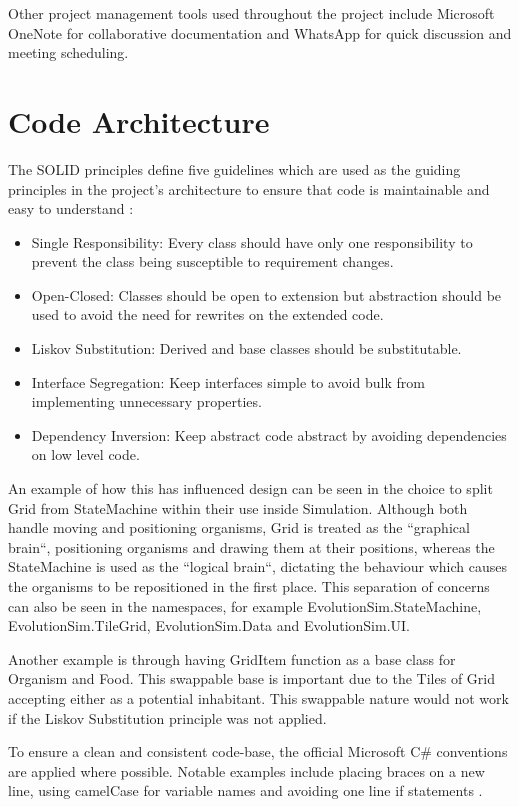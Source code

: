 \documentclass[a4paper, oneside, 11pt]{report}
\begin{document}
Other project management tools used throughout the project include Microsoft OneNote for collaborative documentation and WhatsApp for quick discussion and meeting scheduling.

\section{Code Architecture}\label{architecture}
The SOLID principles define five guidelines which are used as the guiding principles in the project's architecture to ensure that code is maintainable and easy to understand \cite{kelmendi}:
\begin{itemize}
	\item Single Responsibility: Every class should have only one responsibility to prevent the class being susceptible to requirement changes.
	\item Open-Closed: Classes should be open to extension but abstraction should be used to avoid the need for rewrites on the extended code.
	\item Liskov Substitution: Derived and base classes should be substitutable.
	\item Interface Segregation: Keep interfaces simple to avoid bulk from implementing unnecessary properties.
	\item Dependency Inversion: Keep abstract code abstract by avoiding dependencies on low level code.
\end{itemize}

An example of how this has influenced design can be seen in the choice to split Grid from StateMachine within their use inside Simulation. Although both handle moving and positioning organisms, Grid is treated as the ``graphical brain``, positioning organisms and drawing them at their positions, whereas the StateMachine is used as the ``logical brain``, dictating the behaviour which causes the organisms to be repositioned in the first place. This separation of concerns can also be seen in the namespaces, for example EvolutionSim.StateMachine, EvolutionSim.TileGrid, EvolutionSim.Data and EvolutionSim.UI.

Another example is through having GridItem function as a base class for Organism and Food. This swappable base is important due to the Tiles of Grid accepting either as a potential inhabitant. This swappable nature would not work if the Liskov Substitution principle was not applied.

To ensure a clean and consistent code-base, the official Microsoft C\# conventions are applied where possible. Notable examples include placing braces on a new line, using camelCase for variable names and avoiding one line if statements \cite{microsoft}.
\end{document}
